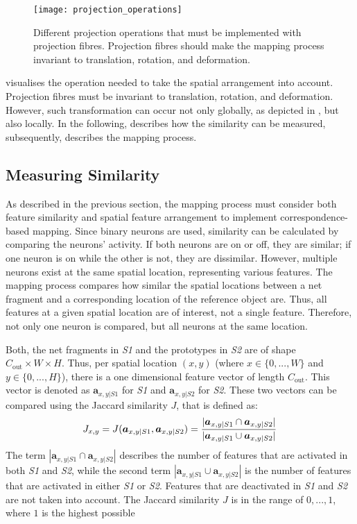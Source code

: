 \begin{figure}[h]
    \centering
    \texttt{[image: projection\_operations]}
    \caption[Different projection operation]{Different projection operations that must be implemented with projection fibres. Projection fibres should make the mapping process invariant to translation, rotation, and deformation.}
\end{figure}
 visualises the operation needed to take the spatial arrangement into account.
Projection fibres must be invariant to translation, rotation, and deformation. However, such transformation can occur not only globally, as depicted in , but also locally.
In the following,  describes how the similarity can be measured, subsequently,  describes the mapping process.

\subsection{Measuring Similarity}
As described in the previous section, the mapping process must consider both feature similarity and  spatial feature arrangement to implement correspondence-based mapping.
Since binary neurons are used, similarity can be calculated by comparing the neurons' activity. If both neurons are on or off, they are similar; if one neuron is on while the other is not, they are dissimilar.
However, multiple neurons exist at the same spatial location, representing various features.
The mapping process compares how similar the spatial locations between a net fragment and a corresponding location of the reference object are.
Thus, all features at a given spatial location are of interest, not a single feature. Therefore, not only one neuron is compared, but all neurons at the same location.

Both, the net fragments in \emph{S1} and the prototypes in \emph{S2} are of shape $C_{\text{out}} \times W \times H$. Thus, per spatial location $(x,y)$ (where $x \in \{0, ..., W\}$ and $y \in \{0, ..., H\}$), there is a one dimensional feature vector of length $C_{\text{out}}$. This vector is denoted as $\boldsymbol{a}_{x,y|S1}$ for \emph{S1} and $\boldsymbol{a}_{x,y|S2}$ for \emph{S2}.
These two vectors can be compared using the Jaccard similarity $J$, that is defined as:
%
\begin{align}\eqlbl{jaccard}
	J_{x,y} = J(\boldsymbol{a}_{x,y|S1}, \boldsymbol{a}_{x,y|S2}) = \frac{|\boldsymbol{a}_{x,y|S1} \cap \boldsymbol{a}_{x,y|S2}|}{|\boldsymbol{a}_{x,y|S1} \cup \boldsymbol{a}_{x,y|S2}|}
\end{align}
%
The term $|\boldsymbol{a}_{x,y|S1} \cap \boldsymbol{a}_{x,y|S2}|$ describes the number of features that are activated in both \emph{S1} and \emph{S2}, while the second term $|\boldsymbol{a}_{x,y|S1} \cup \boldsymbol{a}_{x,y|S2}|$ is the number of features that are activated in either \emph{S1} or \emph{S2}. Features that are deactivated in \emph{S1} and \emph{S2} are not taken into account.
The Jaccard similarity $J$ is in the range of $0, ..., 1$, where $1$ is the highest possible 

